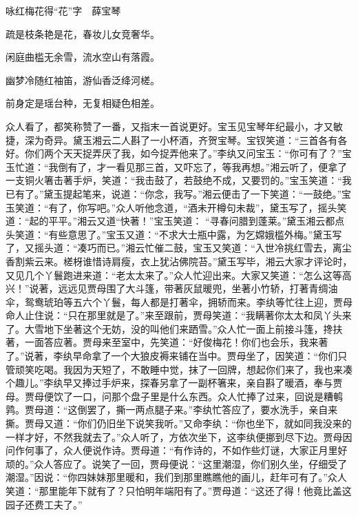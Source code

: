 \begin{poem}
    \emptypl
    \begin{pl}
        咏红梅花得“花”字　薛宝琴
    \end{pl}
    \begin{pl}

        疏是枝条艳是花，春妆儿女竞奢华。
    \end{pl}
    \begin{pl}

        闲庭曲槛无余雪，流水空山有落霞。
    \end{pl}
    \begin{pl}

        幽梦冷随红袖笛，游仙香泛绛河槎。
    \end{pl}
    \begin{pl}

        前身定是瑶台种，无复相疑色相差。
    \end{pl}
\end{poem}


\begin{parag}
    众人看了，都笑称赞了一番，又指末一首说更好。宝玉见宝琴年纪最小，才又敏捷，深为奇异。黛玉湘云二人斟了一小杯酒，齐贺宝琴。宝钗笑道：“三首各有各好。你们两个天天捉弄厌了我，如今捉弄他来了。”李纨又问宝玉：“你可有了？”宝玉忙道：“我倒有了，才一看见那三首，又吓忘了，等我再想。”湘云听了，便拿了一支铜火箸击著手炉，笑道：“我击鼓了，若鼓绝不成，又要罚的。”宝玉笑道：“我已有了。”黛玉提起笔来，说道：“你念，我写。”湘云便击了一下笑道：“一鼓绝。”宝玉笑道：“有了，你写吧。”众人听他念道，“酒未开樽句未裁”，黛玉写了，摇头笑道：“起的平平。”湘云又道“快著！”宝玉笑道： “寻春问腊到蓬莱。”黛玉湘云都点头笑道：“有些意思了。”宝玉又道：“不求大士瓶中露，为乞嫦娥槛外梅。”黛玉写了，又摇头道：“凑巧而已。”湘云忙催二鼓，宝玉又笑道：“入世冷挑红雪去，离尘香割紫云来。槎枒谁惜诗肩瘦，衣上犹沾佛院苔。”黛玉写毕，湘云大家才评论时，又见几个丫鬟跑进来道：“老太太来了。”众人忙迎出来。大家又笑道：“怎么这等高兴！”说著，远远见贾母围了大斗篷，带著灰鼠暖兜，坐著小竹轿，打著青绸油伞，鸳鸯琥珀等五六个丫鬟，每人都是打著伞，拥轿而来。李纨等忙往上迎，贾母命人止住说：“只在那里就是了。”来至跟前，贾母笑道：“我瞒著你太太和凤丫头来了。大雪地下坐著这个无妨，没的叫他们来跴雪。”众人忙一面上前接斗篷，搀扶著，一面答应著。贾母来至室中，先笑道：“好俊梅花！你们也会乐，我来著了。”说著，李纨早命拿了一个大狼皮褥来铺在当中。贾母坐了，因笑道：“你们只管顽笑吃喝。我因为天短了，不敢睡中觉，抹了一回牌，想起你们来了，我也来凑个趣儿。”李纨早又捧过手炉来，探春另拿了一副杯箸来，亲自斟了暖酒，奉与贾母。贾母便饮了一口，问那个盘子里是什么东西。众人忙捧了过来，回说是糟鹌鹑。贾母道：“这倒罢了，撕一两点腿子来。”李纨忙答应了，要水洗手，亲自来撕。贾母又道：“你们仍旧坐下说笑我听。”又命李纨：“你也坐下，就如同我没来的一样才好，不然我就去了。”众人听了，方依次坐下，这李纨便挪到尽下边。贾母因问作何事了，众人便说作诗。贾母道：“有作诗的，不如作些灯谜，大家正月里好顽的。”众人答应了。说笑了一回，贾母便说：“这里潮湿，你们别久坐，仔细受了潮湿。”因说：“你四妹妹那里暖和，我们到那里瞧瞧他的画儿，赶年可有了。”众人笑道：“那里能年下就有了？只怕明年端阳有了。”贾母道：“这还了得！他竟比盖这园子还费工夫了。”
\end{parag}


